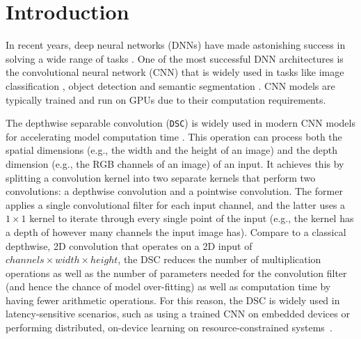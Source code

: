 \section{Introduction}

In recent years, deep neural networks (DNNs) have made astonishing success in solving a wide range of tasks \cite{zoran2020towards,yang2020gated,wang2020rdsnet,chen2020mnasfpn,zhong2020squeeze,tokunaga2019adaptive}. One of the
most successful DNN architectures is the convolutional neural network (CNN) that is widely used in tasks like image classification
\cite{zoran2020towards,yang2020gated}, object detection \cite{wang2020rdsnet,chen2020mnasfpn} and  semantic segmentation \cite{zhong2020squeeze,tokunaga2019adaptive}. CNN models are typically trained and run on
GPUs due to their computation requirements.


The depthwise separable convolution (\texttt{DSC}) is widely used in modern CNN models for accelerating model computation time
\cite{howard2019searching,tan2019efficientnet,haase2020rethinking,zhang2019depth}. This operation can process both the spatial dimensions (e.g., the width and the height of an image) and the depth
dimension (e.g., the RGB channels of an image) of an input. It achieves this by splitting a convolution kernel into two separate kernels
that perform two convolutions: a depthwise convolution and a pointwise convolution. The former applies a single convolutional filter for
each input channel, and the latter uses a $1 \times 1$ kernel to iterate through every single point of the input (e.g., the kernel has a
depth of however many channels the input image has). Compare to a classical depthwise, 2D convolution that operates on a 2D input of
$channels \times width \times height$, the DSC reduces the number of multiplication operations as well as the number of parameters needed
for the convolution filter (and hence the chance of model over-fitting) as well as computation time by having fewer arithmetic operations.
For this reason, the DSC is widely used in latency-sensitive scenarios, such as using a trained CNN on embedded devices or performing
distributed, on-device learning on resource-constrained systems~\cite{espeholt2019seed}.


